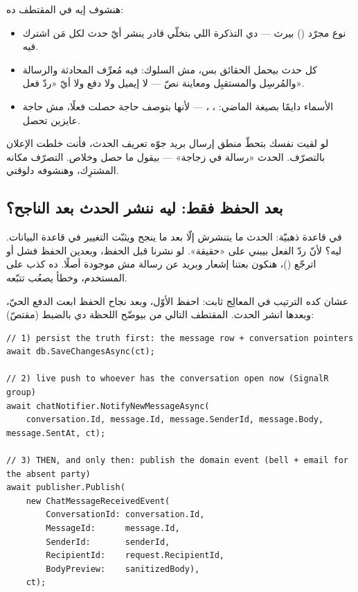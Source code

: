 هنشوف إيه في المقتطف ده:
\begin{itemize}
\item {} نوع مجرّد () بيرث 
  — دي التذكرة اللي بتخلّي  قادر ينشر أيّ حدث لكل مَن اشترك فيه.
\item كل حدث بيحمل الحقائق بس، مش السلوك: 
  فيه مُعرِّف المحادثة والرسالة والمُرسِل والمستقبِل ومعاينة نصّ — لا إيميل ولا
  دفع ولا أيّ «ردّ فعل».
\item الأسماء دايمًا بصيغة الماضي: ،
  ،  — لأنها بتوصف حاجة
  حصلت فعلًا، مش حاجة عايزين تحصل.
\end{itemize}

\begin{keyp}
لو لقيت نفسك بتحطّ منطق إرسال بريد جوّه تعريف الحدث، فأنت خلطت الإعلان بالتصرّف.
الحدث «رسالة في زجاجة» — بيقول ما حصل وخلاص. التصرّف مكانه المشترِك، وهنشوفه دلوقتي.
\end{keyp}

\subsection{بعد الحفظ فقط: ليه ننشر الحدث بعد  الناجح؟}

في قاعدة ذهبيّة: الحدث ما يتنشرش إلّا بعد ما  ينجح
ويثبّت التغيير في قاعدة البيانات. ليه؟ لأنّ ردّ الفعل بيبني على «حقيقة». لو نشرنا
 قبل الحفظ، وبعدين الحفظ فشل أو اترجّع
()، هنكون بعتنا إشعار وبريد عن رسالة مش موجودة أصلًا. ده كذب
على المستخدم، وخطأ يصعُب تتبّعه.

عشان كده الترتيب في المعالِج ثابت: احفظ الأوّل، وبعد نجاح الحفظ ابعت الدفع الحيّ،
وبعدها انشر الحدث. المقتطف التالي من  بيوضّح
اللحظة دي بالضبط (مقتصّ):

\begin{english}
\begin{lstlisting}[language={[Sharp]C}]
// 1) persist the truth first: the message row + conversation pointers
await db.SaveChangesAsync(ct);

// 2) live push to whoever has the conversation open now (SignalR group)
await chatNotifier.NotifyNewMessageAsync(
    conversation.Id, message.Id, message.SenderId, message.Body, message.SentAt, ct);

// 3) THEN, and only then: publish the domain event (bell + email for the absent party)
await publisher.Publish(
    new ChatMessageReceivedEvent(
        ConversationId: conversation.Id,
        MessageId:      message.Id,
        SenderId:       senderId,
        RecipientId:    request.RecipientId,
        BodyPreview:    sanitizedBody),
    ct);
\end{lstlisting}
\end{english}

